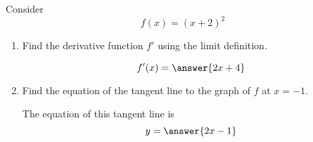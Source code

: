 \documentclass{ximera}
\author{Steven Gubkin}
\begin{document}
\begin{exercise}




Consider 
\[
f(x) = (x+2)^2
\]



\begin{enumerate}
\item Find the derivative function $f'$ using the limit definition.
\begin{prompt} 
\[
f'(x) = \answer{2x+4}
\]
\end{prompt}

\item  Find the equation of the tangent line to the graph of $f$ at $x=-1$.

\begin{prompt} 
The equation of this tangent line is
$$ y = \answer{ 2x - 1}$$ 
\end{prompt}

\end{enumerate}

\end{exercise}
\end{document}
